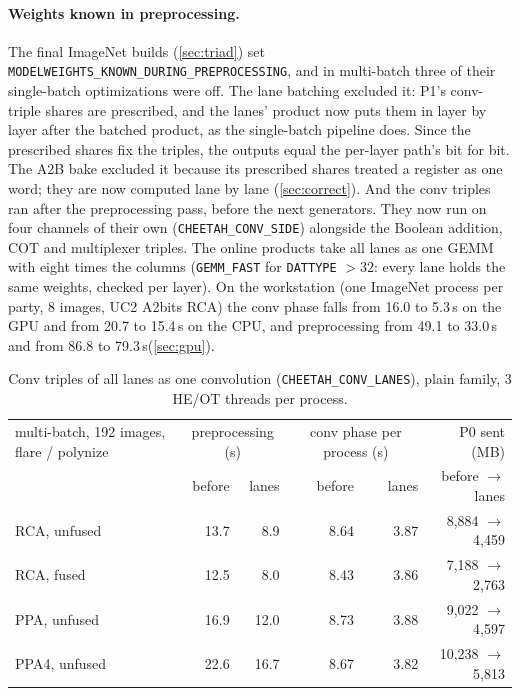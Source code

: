 \documentclass[10pt,a4paper]{article}
\newcommand{\flag}[1]{\nolinkurl{#1}}
\newcommand{\s}{\,s\xspace}
\begin{document}
\paragraph{Weights known in preprocessing.} The final ImageNet builds (\cref{sec:triad}) set
\flag{MODELWEIGHTS_KNOWN_DURING_PREPROCESSING}, and in multi-batch three of their single-batch optimizations were off. The
lane batching excluded it: P1's conv-triple shares are prescribed, and the lanes' product now puts them in layer by
layer after the batched product, as the single-batch pipeline does. Since the prescribed shares fix the triples, the
outputs equal the per-layer path's bit for bit. The A2B bake excluded it because its prescribed shares treated a
register as one word; they are now computed lane by lane (\cref{sec:correct}). And the conv triples ran after the
preprocessing pass, before the next generators. They now run on four channels of their own
(\flag{CHEETAH_CONV_SIDE}) alongside the Boolean addition, COT and multiplexer triples. The online products take all
lanes as one GEMM with eight times the columns (\flag{GEMM_FAST} for \flag{DATTYPE} $> 32$: every lane holds the same
weights, checked per layer). On the workstation (one ImageNet process per party, 8 images, UC2 A2bits RCA) the conv
phase falls from 16.0 to 5.3\s on the GPU and from 20.7 to 15.4\s on the CPU, and preprocessing from 49.1 to 33.0\s and
from 86.8 to 79.3\s (\cref{sec:gpu}).

\begin{table}[t]
\centering\small
\begin{tabular}{@{}lrrrrr@{}}
\toprule
multi-batch, 192 images, flare / polynize & \multicolumn{2}{c}{preprocessing (s)} & \multicolumn{2}{c}{conv phase per process (s)} & P0 sent (MB)\\
& before & lanes & before & lanes & before $\to$ lanes\\
\midrule
RCA, unfused & 13.7 & 8.9 & 8.64 & 3.87 & 8,884 $\to$ 4,459\\
RCA, fused & 12.5 & 8.0 & 8.43 & 3.86 & 7,188 $\to$ 2,763\\
PPA, unfused & 16.9 & 12.0 & 8.73 & 3.88 & 9,022 $\to$ 4,597\\
PPA4, unfused & 22.6 & 16.7 & 8.67 & 3.82 & 10,238 $\to$ 5,813\\
\bottomrule
\end{tabular}
\caption{Conv triples of all lanes as one convolution (\flag{CHEETAH_CONV_LANES}), plain family, 3 HE/OT threads per process.}
\label{tab:lanes}
\end{table}
\end{document}
